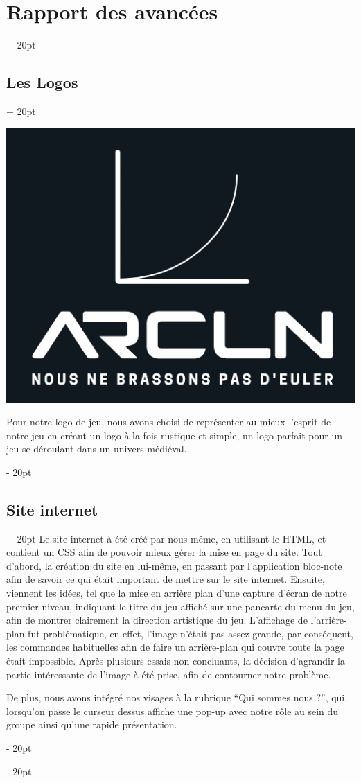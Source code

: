 \documentclass[a4paper, 12pt, twoside]{article}
\newcommand{\ind}[1][20pt]{\advance\leftskip + #1}
\newcommand{\deind}[1][20pt]{\advance\leftskip - #1}
\newenvironment{indt}[2][20pt]{#2 \par \ind[#1]}{\par \deind} %
\begin{document}
\begin{indt}{\section{Rapport des avancées}}
\begin{indt}{\subsection{Les Logos}}
            \begin{center}
                \includegraphics[width=0.5\linewidth]{Logo2.png}
            \end{center}

            Pour notre logo de jeu, nous avons choisi de représenter au mieux l'esprit de notre jeu en créant un logo à la fois rustique et simple, un logo parfait pour un jeu se déroulant dans un univers médiéval.
        \end{indt}

        \begin{indt}{\subsection{Site internet}}
            Le site internet à été créé par nous même, en utilisant le HTML, et contient un CSS afin de pouvoir mieux gérer la mise en page du site. Tout d'abord, la création du site en lui-même, en passant par l'application bloc-note afin de savoir ce qui était important de mettre sur le site internet. Ensuite, viennent les idées, tel que la mise en arrière plan d'une capture d'écran de notre premier niveau, indiquant le titre du jeu affiché sur une pancarte du menu du jeu, afin de montrer clairement la direction artistique du jeu. L'affichage de l'arrière-plan fut problématique, en effet, l'image n'était pas assez grande, par conséquent, les commandes habituelles afin de faire un arrière-plan qui couvre toute la page était impossible. Après plusieurs essais non concluants, la décision d'agrandir la partie intéressante de l'image à été prise, afin de contourner notre problème.

            De plus, nous avons intégré nos visages à la rubrique “Qui sommes nous ?”, qui, lorsqu'on passe le curseur dessus affiche une pop-up avec notre rôle au sein du groupe ainsi qu'une rapide présentation.

        \end{indt}


\end{indt}
\end{document}
